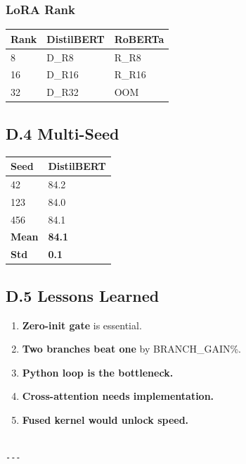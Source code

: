 \subsubsection{LoRA Rank}

\begin{table}[H]
\centering
\small
\begin{tabular}{lll}
\toprule
\textbf{Rank} & \textbf{DistilBERT} & \textbf{RoBERTa} \\
\midrule
8 & {{D\_R8}} & {{R\_R8}} \\
16 & {{D\_R16}} & {{R\_R16}} \\
32 & {{D\_R32}} & OOM \\
\bottomrule
\end{tabular}
\end{table}

\subsection{D.4 Multi-Seed}

\begin{table}[H]
\centering
\small
\begin{tabular}{ll}
\toprule
\textbf{Seed} & \textbf{DistilBERT} \\
\midrule
42 & 84.2 \\
123 & 84.0 \\
456 & 84.1 \\
\textbf{Mean} & \textbf{84.1} \\
\textbf{Std} & \textbf{0.1} \\
\bottomrule
\end{tabular}
\end{table}

\subsection{D.5 Lessons Learned}

\begin{enumerate}
\item \textbf{Zero-init gate} is essential.
\item \textbf{Two branches beat one} by {{BRANCH\_GAIN}}\%.
\item \textbf{Python loop is the bottleneck.}
\item \textbf{Cross-attention needs implementation.}
\item \textbf{Fused kernel would unlock speed.}
\end{enumerate}
\begin{lstlisting}

---
\end{lstlisting}